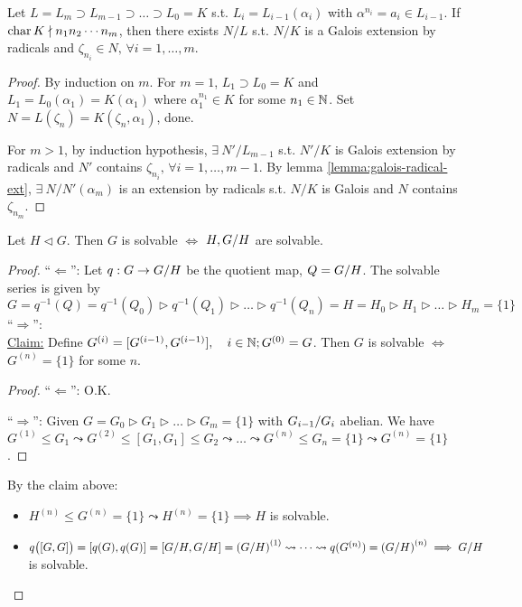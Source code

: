 \begin{lemma} \label{lemma:radical-ext-chain-galois}
  Let $L = L_m \supset L_{m-1} \supset \dots \supset L_0 = K$ s.t.
  $L_i = L_{i-1}(\alpha_i)$ with $\alpha^{n_i} = a_i \in L_{i-1}$.
  If $\operatorname{char} K \nmid n_1n_2\cdots n_m$, then there exists $N/L$ s.t.
  $N/K$ is a Galois extension by radicals and $\zeta_{n_i} \in N, \,
  \forall i = 1, \dots, m$.

  \begin{proof}
    By induction on $m$. For $m = 1$, $L_1 \supset L_0 = K$ and
    $L_1 = L_0(\alpha_1) = K(\alpha_1)$ where $\alpha_1^{n_1} \in K$ for some
    $n_1\in \mathbb{N}$. Set $N = L(\zeta_n) = K(\zeta_n, \alpha_1)$, done.

    For $m > 1$, by induction hypothesis, $\exists\: N'/L_{m-1}$ s.t.
    $N'/K$ is Galois extension by radicals and $N'$ contains
    $\zeta_{n_i},\, \forall i = 1, \dots, m-1$.
    By lemma \ref{lemma:galois-radical-ext}, $\exists\: N/N'(\alpha_m)$ is
    an extension by radicals s.t. $N/K$ is Galois and $N$ contains $\zeta_{n_m}$.
  \end{proof}
\end{lemma}

\begin{prop} \label{prop:quot-solvable}
  Let $H \lhd G$. Then $G$ is solvable $\iff$ $H, {G}/{H}$ are solvable.

  \begin{proof}
    ``$\Leftarrow$'': Let $q: G \to {G}/{H}$ be the quotient map,
    $Q = {G}/{H}$. The solvable series is given by
    \[
      G = q^{-1}(Q) = q^{-1}(Q_0) \rhd q^{-1}(Q_1) \rhd \dots \rhd q^{-1}(Q_n)
      = H = H_0 \rhd H_1 \rhd \dots \rhd H_m = \{ 1 \}
    \]
    ``$\Rightarrow$'': \\
    \underline{Claim:} Define $G^{(i)} = [G^{(i-1)}, G^{(i-1)}], \quad
    i \in \mathbb{N}; G^{(0)} = G$.
    Then $G$ is solvable $\iff$ $G^{(n)} = \{1 \}$ for some $n$.
    \begin{proof}
      ``$\Leftarrow$'': O.K.

      ``$\Rightarrow$'': Given $G = G_0 \rhd G_1 \rhd \dots \rhd G_m = \{1\}$
      with ${G_{i-1}}/{G_i}$ abelian.
      We have $G^{(1)} \le G_1 \leadsto G^{(2)} \le [G_1, G_1] \le G_2 \leadsto
      \dots \leadsto G^{(n)} \le G_n = \{ 1 \} \leadsto G^{(n)} = \{1\}$.
    \end{proof}
    By the claim above:
    \begin{itemize}
      \item $H^{(n)} \le G^{(n)} = \{1\} \leadsto H^{(n)} = \{1\} \implies H$ 
        is solvable.
      \item $q\big([G, G]\big) = [q(G), q(G)] = [{G}/{H}, {G}/{H}] =
        \left({G}/{H}\right)^{(1)} \leadsto \dots \leadsto
        q(G^{(n)}) = \left({G}/{H}\right)^{(n)} \implies {G}/{H}$
        is solvable.
    \end{itemize}
  \end{proof}
\end{prop}


